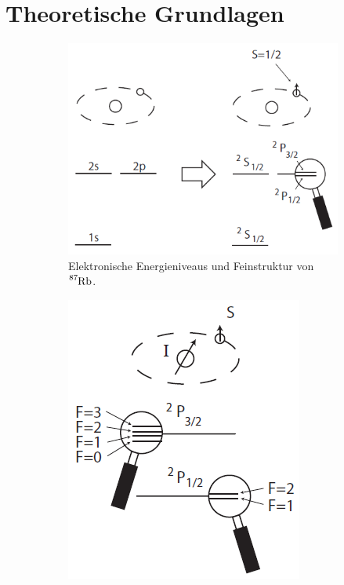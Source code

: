 \section{Theoretische Grundlagen}
    \begin{figure}[htbp]
        \centering
        \begin{subfigure}[t]{0.38\linewidth}
            \centering
            \includegraphics[width = \linewidth]{pictures/Feinstruktur.png}
            \caption{Elektronische Energieniveaus und Feinstruktur von $\ce{^{87}Rb}$.}
            \label{fig:Feinstruktur}
        \end{subfigure}
        \hfill
        \begin{subfigure}[t]{0.26\linewidth}
            \centering
            \includegraphics[width = \linewidth]{pictures/Hyperfeinstruktur.png}

\end{subfigure}
\end{figure}
